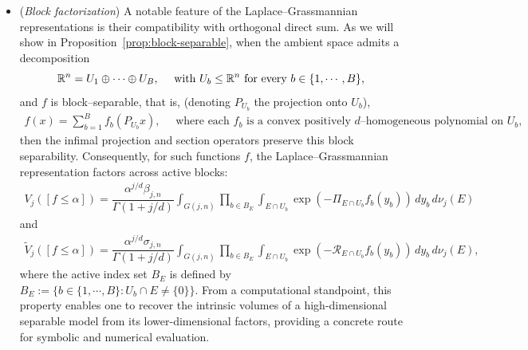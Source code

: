 \documentclass[11pt]{article}
\theoremstyle{definition}
\numberwithin{equation}{section}
\newcommand{\R}{\mathbb{R}}
\begin{document}
\begin{itemize}
    \medskip

    Using the Laplace--Grassmannian representations~\eqref{LG-repre}, we extend this framework to encompass all $ j \in \{1, \cdots, n - 1 \}$ and all even ${d \geq 2}$, 
    thereby unifying the intrinsic and dual volume cases beyond the classical quadratic and volumetric settings.
    We further derive the first--order (KKT) conditions for the associated L\"owner--John--type problems.
    To get the G\^ateaux derivative for KKT conditions, on the section side $\mathscr R_E$, one may differentiate the Laplace--Grassmannian average directly,  while on the projection side $\Pi_E$, one has to use the Danskin--type envelope theorem, see Lemmas~\ref{lem.Vtil-gateaux}--~\ref{lem.V-gateaux}.

    \item
    (\textit{Block factorization})
    A notable feature of the Laplace--Grassmannian representations is their compatibility with orthogonal direct sum.
    As we will show in Proposition~\ref{prop:block-separable}, when the ambient space admits a decomposition
    \[
        \R^n = U_1 \oplus \cdots \oplus U_B, \quad \text{ with $ U_b\leq \R^n$ for every } b \in \{1, \cdots, B \},
    \]
    and $f$ is block--separable, that is, (denoting $P_{U_b}$ the projection onto $U_b$), 
    \begin{align*}
        f(x) = \sum_{b = 1}^B f_b(P_{U_b} x), \quad \text{ where each $f_b$ is a convex positively $d$--homogeneous polynomial on $U_b$},
    \end{align*}
    then the infimal projection and section operators preserve this block separability.
    Consequently, for such  functions $f$, the Laplace--Grassmannian representation factors across active blocks:
    \begin{align*}
    V_j([f \leq \alpha]) = \dfrac{\alpha^{j/d}\beta_{j, n}}{\Gamma(1 + j/d)} \int_{G(j, n)} \prod_{b \in B_E} \int_{E \cap U_b} \exp(- \Pi_{E \cap U_b} f_b(y_b)) \, dy_b \, d\nu_j(E)
\end{align*}
and 
\begin{align*}
    \widetilde V_j([f \leq \alpha]) = \dfrac{\alpha^{j/d}\sigma_{j, n}}{\Gamma(1 + j/d)} \int_{G(j, n)} \prod_{b \in B_E} \int_{E \cap U_b} \exp(- \mathscr R_{E \cap U_b} f_b(y_b)) \, dy_b \, d\nu_j(E),
\end{align*}
where the active index set $B_E$ is defined by $B_E := \{ b \in \{1, \cdots, B \}: U_b \cap E \neq \{ 0 \} \}$.
From a computational standpoint, this property enables one to recover the intrinsic volumes of a high-dimensional separable model from its lower-dimensional factors, providing a concrete route for symbolic and numerical evaluation.


\end{itemize}
\end{document}
